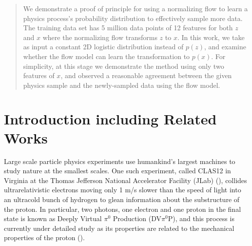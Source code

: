 \begin{abstract}
We demonstrate a proof of principle for using a normalizing flow to learn a physics process's probability distribution to effectively sample more data. The training data set has 5 million data points of 12 features for both $z$ and $x$ where the normalizing flow transforms $z$ to $x$. In this work, we take as input a constant 2D logistic distribution instead of $p(z)$, and examine whether the flow model can learn the transformation to $p(x)$. For simplicity, at this stage we demonstrate the method using only two features of $x$, and observed a reasonable agreement between the given physics sample and the newly-sampled data using the flow model.
\end{abstract}
\section{Introduction including Related Works }

Large scale particle physics experiments use humankind's largest machines to study nature at the smallest scales. One such experiment, called CLAS12 in Virginia at the Thomas Jefferson National Accelerator Facility (JLab) (\citet{BURKERT2020163419}), collides ultrarelativistic electrons moving only 1 m/s slower than the speed of light into an ultracold bunch of hydrogen to glean information about the substructure of the proton. In particular, two photons, one electron and one proton in the final state is known as Deeply Virtual $\pi^0$ Production (DV$\pi^0$P), and this process is currently under detailed study as its properties are related to the mechanical properties of the proton (\citet{PhysRevD.55.7114}).

